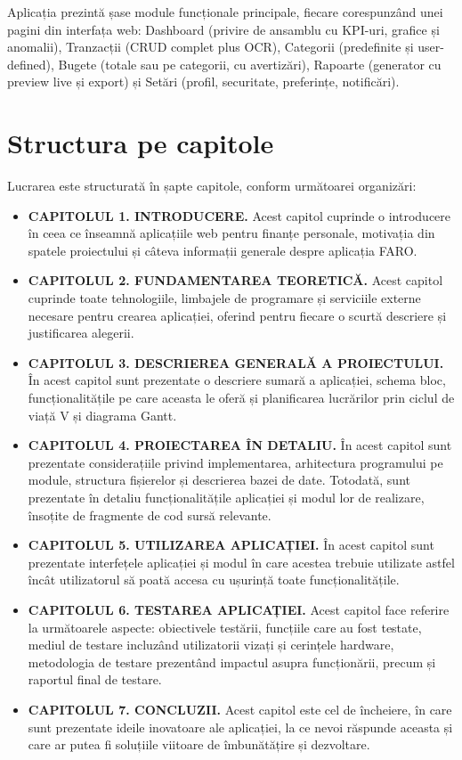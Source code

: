 \documentclass[12pt,a4paper,oneside]{report}
\begin{document}
Aplicația prezintă șase module funcționale principale, fiecare corespunzând unei pagini din interfața web: Dashboard (privire de ansamblu cu KPI-uri, grafice și anomalii), Tranzacții (CRUD complet plus OCR), Categorii (predefinite și user-defined), Bugete (totale sau pe categorii, cu avertizări), Rapoarte (generator cu preview live și export) și Setări (profil, securitate, preferințe, notificări).

\section{Structura pe capitole}

Lucrarea este structurată în șapte capitole, conform următoarei organizări:

\begin{itemize}[leftmargin=2cm,itemsep=4pt]
  \item \textbf{CAPITOLUL 1. INTRODUCERE.} Acest capitol cuprinde o introducere în ceea ce înseamnă aplicațiile web pentru finanțe personale, motivația din spatele proiectului și câteva informații generale despre aplicația FARO.

  \item \textbf{CAPITOLUL 2. FUNDAMENTAREA TEORETICĂ.} Acest capitol cuprinde toate tehnologiile, limbajele de programare și serviciile externe necesare pentru crearea aplicației, oferind pentru fiecare o scurtă descriere și justificarea alegerii.

  \item \textbf{CAPITOLUL 3. DESCRIEREA GENERALĂ A PROIECTULUI.} În acest capitol sunt prezentate o descriere sumară a aplicației, schema bloc, funcționalitățile pe care aceasta le oferă și planificarea lucrărilor prin ciclul de viață V și diagrama Gantt.

  \item \textbf{CAPITOLUL 4. PROIECTAREA ÎN DETALIU.} În acest capitol sunt prezentate considerațiile privind implementarea, arhitectura programului pe module, structura fișierelor și descrierea bazei de date. Totodată, sunt prezentate în detaliu funcționalitățile aplicației și modul lor de realizare, însoțite de fragmente de cod sursă relevante.

  \item \textbf{CAPITOLUL 5. UTILIZAREA APLICAȚIEI.} În acest capitol sunt prezentate interfețele aplicației și modul în care acestea trebuie utilizate astfel încât utilizatorul să poată accesa cu ușurință toate funcționalitățile.

  \item \textbf{CAPITOLUL 6. TESTAREA APLICAȚIEI.} Acest capitol face referire la următoarele aspecte: obiectivele testării, funcțiile care au fost testate, mediul de testare incluzând utilizatorii vizați și cerințele hardware, metodologia de testare prezentând impactul asupra funcționării, precum și raportul final de testare.

  \item \textbf{CAPITOLUL 7. CONCLUZII.} Acest capitol este cel de încheiere, în care sunt prezentate ideile inovatoare ale aplicației, la ce nevoi răspunde aceasta și care ar putea fi soluțiile viitoare de îmbunătățire și dezvoltare.
\end{itemize}
\end{document}
